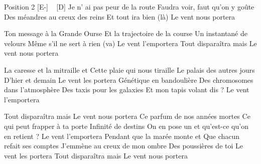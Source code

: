 
Position 2
[E-] ~ [D]
Je n' ai pas peur de la route
Faudra voir, faut qu'on y goûte
Des méandres au creux des reins
Et tout ira bien (là)
Le vent nous portera

Ton message à la Grande Ourse
Et la trajectoire de la course
Un instantané de velours
Même s'il ne sert à rien (va)
Le vent l'emportera
Tout disparaîtra mais
Le vent nous portera

La caresse et la mitraille
et Cette plaie qui nous tiraille
Le palais des autres jours
D'hier et demain
Le vent les portera
Génétique en bandoulière
Des chromosomes dans l'atmosphère
Des taxis pour les galaxies
Et mon tapis volant dis ?
Le vent l'emportera

Tout disparaîtra mais
Le vent nous portera
Ce parfum de nos années mortes
Ce qui peut frapper à ta porte
Infinité de destins
On en pose un et qu'est-ce qu'on en retient ?
Le vent l'emportera
Pendant que la marée monte
et Que chacun refait ses comptes
J'emmène au creux de mon ombre
Des poussières de toi
Le vent les portera
Tout disparaîtra mais
Le vent nous portera 